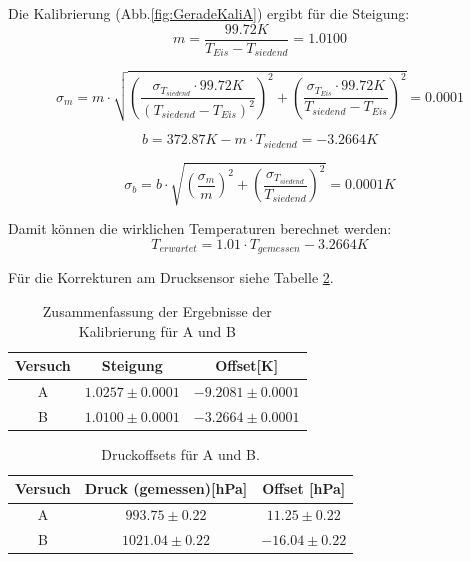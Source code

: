\documentclass[12pt,a4paper]{article}
\begin{document}
Die Kalibrierung (Abb.\ref{fig:GeradeKaliA}) ergibt für die Steigung:
\begin{equation}
m = \dfrac{99.72K}{T_{Eis}-T_{siedend}} = 1.0100
\end{equation}

\begin{equation}
\sigma_{m} = m\cdot \sqrt{(\dfrac{\sigma_{T_{siedend}}\cdot 99.72K}{(T_{siedend}-T_{Eis})^{2}})^{2}+(\dfrac{\sigma_{T_{Eis}}\cdot 99.72K}{T_{siedend}-T_{Eis}})^{2}} = 0.0001
\end{equation}

\begin{equation}
b = 372.87K-m\cdot T_{siedend} = -3.2664K
\end{equation}

\begin{equation}
\sigma_{b} = b\cdot \sqrt{(\dfrac{\sigma_{m}}{m})^{2}+(\dfrac{\sigma_{T_{siedend}}}{T_{siedend}})^{2}} = 0.0001K
\end{equation}


Damit können die wirklichen Temperaturen berechnet werden:
\begin{equation}
T_{erwartet}=1.01\cdot T_{gemessen}-3.2664K
\end{equation}
 

Für die Korrekturen am Drucksensor siehe Tabelle \ref{tab:Druckoffsets}.

\begin{table}
\begin{center}
\begin{tabular}{|c|c|c|}
\hline
Versuch & Steigung & Offset[K]\\
\hline
A & $1.0257 \pm 0.0001$ & $-9.2081 \pm 0.0001$\\
\hline
B & $1.0100 \pm 0.0001$ & $-3.2664 \pm 0.0001$\\
\hline
\end{tabular}
\end{center}
\caption{Zusammenfassung der Ergebnisse der Kalibrierung für A und B}
\label{tab:KaliErgebnisseAundB}
\end{table}


\begin{table}
\begin{center}
\begin{tabular}{|c|c|c|}
\hline
Versuch & Druck (gemessen)[hPa] & Offset [hPa]\\
\hline
A & $993.75 \pm 0.22$ & $11.25 \pm 0.22$\\
\hline
B & $1021.04 \pm 0.22$ & $-16.04 \pm 0.22$\\
\hline
\end{tabular}
\end{center}
\caption[Offsets]{Druckoffsets für A und B.}
\label{tab:Druckoffsets}
\end{table}
\end{document}
